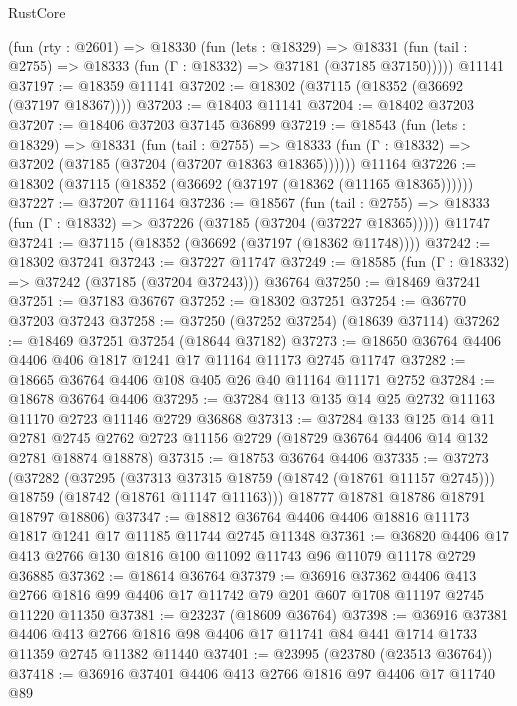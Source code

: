 \begin{lexlean}{RustCore}
\begin{coremodule}
    (fun (rty : @2601) =>
    @18330
      (fun (lets : @18329) =>
      @18331 (fun (tail : @2755) => @18333 (fun (Γ : @18332) => @37181 (@37185 @37150)))))
    @11141
@37197 := @18359 @11141
@37202 := @18302 (@37115 (@18352 (@36692 (@37197 @18367))))
@37203 := @18403 @11141
@37204 := @18402 @37203
@37207 := @18406 @37203 @37145 @36899
@37219 := @18543
    (fun (lets : @18329) =>
    @18331
      (fun (tail : @2755) =>
      @18333 (fun (Γ : @18332) => @37202 (@37185 (@37204 (@37207 @18363 @18365))))))
    @11164
@37226 := @18302 (@37115 (@18352 (@36692 (@37197 (@18362 (@11165 @18365))))))
@37227 := @37207 @11164
@37236 := @18567
    (fun (tail : @2755) => @18333 (fun (Γ : @18332) => @37226 (@37185 (@37204 (@37227 @18365)))))
    @11747
@37241 := @37115 (@18352 (@36692 (@37197 (@18362 @11748))))
@37242 := @18302 @37241
@37243 := @37227 @11747
@37249 := @18585 (fun (Γ : @18332) => @37242 (@37185 (@37204 @37243))) @36764
@37250 := @18469 @37241
@37251 := @37183 @36767
@37252 := @18302 @37251
@37254 := @36770 @37203 @37243
@37258 := @37250 (@37252 @37254) (@18639 @37114)
@37262 := @18469 @37251 @37254 (@18644 @37182)
@37273 := @18650 @36764 @4406 @4406 @406 @1817 @1241 @17 @11164 @11173 @2745 @11747
@37282 := @18665 @36764 @4406 @108 @405 @26 @40 @11164 @11171 @2752
@37284 := @18678 @36764 @4406
@37295 := @37284 @113 @135 @14 @25 @2732 @11163 @11170 @2723 @11146 @2729 @36868
@37313 := @37284
    @133
    @125
    @14
    @11
    @2781
    @2745
    @2762
    @2723
    @11156
    @2729
    (@18729 @36764 @4406 @14 @132 @2781 @18874 @18878)
@37315 := @18753 @36764 @4406
@37335 := @37273
    (@37282
      (@37295
        (@37313 @37315 @18759 (@18742 (@18761 @11157 @2745)))
        @18759
        (@18742 (@18761 @11147 @11163)))
      @18777
      @18781
      @18786
      @18791
      @18797
      @18806)
@37347 := @18812 @36764 @4406 @4406 @18816 @11173 @1817 @1241 @17 @11185 @11744 @2745 @11348
@37361 := @36820 @4406 @17 @413 @2766 @130 @1816 @100 @11092 @11743 @96 @11079 @11178 @2729 @36885
@37362 := @18614 @36764
@37379 := @36916
    @37362
    @4406
    @413
    @2766
    @1816
    @99
    @4406
    @17
    @11742
    @79
    @201
    @607
    @1708
    @11197
    @2745
    @11220
    @11350
@37381 := @23237 (@18609 @36764)
@37398 := @36916
    @37381
    @4406
    @413
    @2766
    @1816
    @98
    @4406
    @17
    @11741
    @84
    @441
    @1714
    @1733
    @11359
    @2745
    @11382
    @11440
@37401 := @23995 (@23780 (@23513 @36764))
@37418 := @36916
    @37401
    @4406
    @413
    @2766
    @1816
    @97
    @4406
    @17
    @11740
    @89

\end{coremodule}
\end{lexlean}
